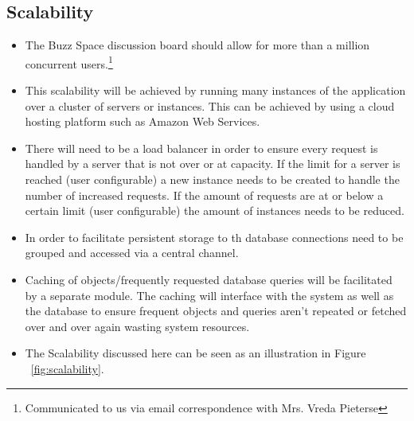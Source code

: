 \documentclass[a4paper,12pt]{article}
\begin{document}
\subsection{Scalability}
\begin{itemize}
	\item The Buzz Space discussion board should allow for more than a million concurrent users.\footnote{Communicated to us via email correspondence with Mrs. Vreda Pieterse}
	\item This scalability will be achieved by running many instances of the application over a cluster of servers or instances. This can be achieved by using a cloud hosting platform such as Amazon Web Services.
	\item There will need to be a load balancer in order to ensure every request is handled by a server that is not over or at capacity. If the limit for a server is reached (user configurable) a new instance needs to be created to handle the number of increased requests. If the amount of requests are at or below a certain limit (user configurable) the amount of instances needs to be reduced.
	\item In order to facilitate persistent storage to th database connections need to be grouped and accessed via a central channel. 
	\item Caching of objects/frequently requested database queries will be facilitated by a separate module. The caching will interface with the system as well as the database to ensure frequent objects and queries aren't repeated or fetched over and over again wasting system resources.
	\item The Scalability discussed here can be seen as an illustration in Figure ~\ref{fig:scalability}.
	\begin{figure}[H]
		\centering

\end{figure}
\end{itemize}
\end{document}

